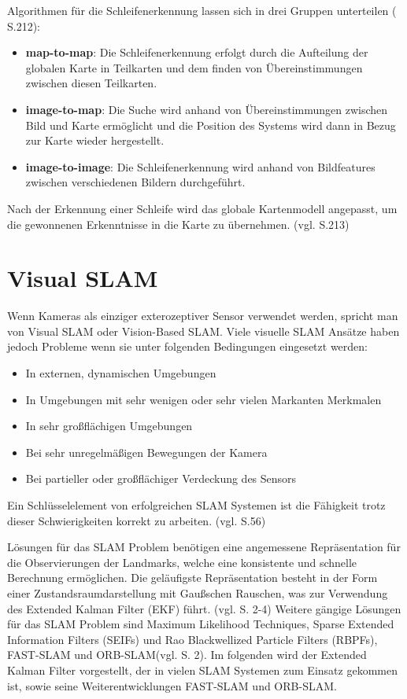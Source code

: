 Algorithmen für die Schleifenerkennung lassen sich in drei Gruppen unterteilen (\cite{loop_closure} S.212):

\begin{itemize}
\item \textbf{map-to-map}: Die Schleifenerkennung erfolgt durch die Aufteilung der globalen Karte in Teilkarten und dem finden von Übereinstimmungen zwischen diesen Teilkarten.

\item \textbf{image-to-map}: Die Suche wird anhand von Übereinstimmungen zwischen Bild und Karte ermöglicht und die Position des Systems wird dann in Bezug zur Karte wieder hergestellt.

\item \textbf{image-to-image}: Die Schleifenerkennung wird anhand von Bildfeatures zwischen verschiedenen Bildern durchgeführt.

\end{itemize}
Nach der Erkennung einer Schleife wird das globale Kartenmodell angepasst, um die gewonnenen Erkenntnisse in die Karte zu übernehmen. (vgl. \cite{loop_closure} S.213)

\section{Visual SLAM}

Wenn Kameras als einziger exterozeptiver Sensor verwendet werden, spricht man von \glqq Visual SLAM \grqq{} oder \glqq Vision-Based SLAM\grqq{}. Viele visuelle SLAM Ansätze haben jedoch Probleme wenn sie unter folgenden Bedingungen eingesetzt werden:

\begin{itemize}
\item In externen, dynamischen Umgebungen
\item In Umgebungen mit sehr wenigen oder sehr vielen Markanten Merkmalen
\item In sehr großflächigen Umgebungen
\item Bei sehr unregelmäßigen Bewegungen der Kamera
\item Bei partieller oder großflächiger Verdeckung des Sensors
\end{itemize}

Ein Schlüsselelement von erfolgreichen SLAM Systemen ist die Fähigkeit trotz dieser Schwierigkeiten korrekt zu arbeiten. (vgl. \cite{survey} S.56)

Lösungen für das SLAM Problem benötigen eine angemessene Repräsentation für die Observierungen der Landmarks, welche eine konsistente und schnelle Berechnung ermöglichen. Die geläufigste Repräsentation besteht in der Form einer Zustandsraumdarstellung mit Gaußschen Rauschen, was zur Verwendung des \glqq Extended Kalman Filter\grqq{} (EKF) führt. (vgl. \cite{slam} S. 2-4) Weitere gängige Lösungen für das SLAM Problem sind \glqq Maximum Likelihood Techniques\grqq{}, \glqq Sparse Extended Information Filters\grqq{} (SEIFs) und \glqq Rao Blackwellized Particle Filters\grqq{} (RBPFs), \glqq FAST-SLAM\grqq{} und \glqq ORB-SLAM\grqq (vgl. \cite{rao} S. 2). Im folgenden wird der Extended Kalman Filter vorgestellt, der in vielen SLAM Systemen zum Einsatz gekommen ist, sowie seine Weiterentwicklungen FAST-SLAM und ORB-SLAM.
  
